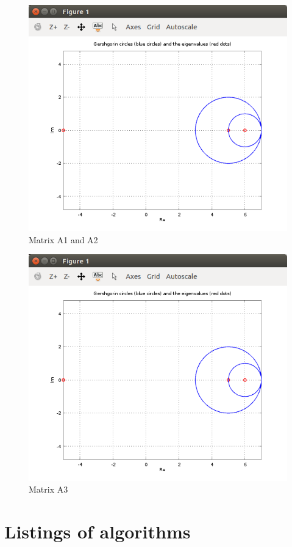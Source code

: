 \documentclass[eng,openany]{mgr}
\begin{document}
\begin{figure}[h]
\centering
\includegraphics[width=0.5\linewidth]{screenshot011}
\caption{Matrix A1 and A2}
\label{fig:screenshot011}
\end{figure}
\begin{figure}[h]
\centering
\includegraphics[width=0.7\linewidth]{screenshot012}
\caption{Matrix A3}
\label{fig:screenshot012}
\end{figure}


\chapter{Listings of algorithms}
\end{document}

